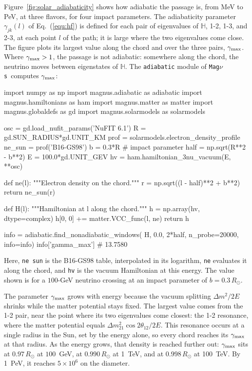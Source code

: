 \documentclass[final,5p,times,twocolumn,sort,compress]{elsarticle}
\makeatletter
\newcommand{\eq}{Eq.}
\DeclareRobustCommand{\_}{%
  \ifmmode\nfss@text{\textunderscore}\else\textunderscore\allowbreak\fi}
\newcommand{\equ}[1]{\eq~(\ref{equ:#1})}
\newcommand{\magnus}{{\tt Mag}\ensuremath{\nu}{\tt s}}
\makeatother
\begin{document}
Figure~\ref{fig:solar_adiabaticity} shows how adiabatic the passage is, from MeV to PeV, at three flavors, for four impact parameters. The adiabaticity parameter $\gamma_{jk}(l)$ of \equ{hf} is defined for each pair of eigenvalues of $\mathbb{H}$, 1-2, 1-3, and 2-3, at each point $l$ of the path; it is large where the two eigenvalues come close. The figure plots its largest value along the chord and over the three pairs, $\gamma_{\rm max}$. Where $\gamma_{\rm max} > 1$, the passage is not adiabatic: somewhere along the chord, the neutrino moves between eigenstates of $\mathbb{H}$. The {\tt adiabatic} module of \magnus\ computes $\gamma_{\rm max}$:
\begin{pysnip}
import numpy as np
import magnus.adiabatic as adiabatic
import magnus.hamiltonians as ham
import magnus.matter as matter
import magnus.globaldefs as gd
import magnus.solarmodels as solarmodels

osc = gd.load_nufit_params('NuFIT 6.1')
R = gd.SUN_RADIUS*gd.UNIT_KM
prof = solarmodels.electron_density_profile
ne_sun = prof('B16-GS98')
b = 0.3*R                # impact parameter
half = np.sqrt(R**2 - b**2)
E = 100.0*gd.UNIT_GEV
hv = ham.hamiltonian_3nu_vacuum(E, **osc)

def ne(l):
    """Electron density on the chord."""
    r = np.sqrt((l - half)**2 + b**2)
    return ne_sun(r)

def H(l):
    """Hamiltonian at l along the chord."""
    h = np.array(hv, dtype=complex)
    h[0, 0] += matter.VCC_func(l, ne)
    return h

info = {}
adiabatic.find_nonadiabatic_windows(
    H, 0.0, 2*half, n_probe=20000,
    info=info)
info['gamma_max']        # 13.7580
\end{pysnip}
Here, {\tt ne\_sun} is the B16-GS98 table, interpolated in its logarithm, {\tt ne} evaluates it along the chord, and {\tt hv} is the vacuum Hamiltonian at this energy. The value shown is for a $100$-GeV neutrino crossing at an impact parameter of $b = 0.3\,R_\odot$.

The parameter $\gamma_{\rm max}$ grows with energy because the vacuum splitting $\Delta m^2/2E$ shrinks while the matter potential stays fixed. The largest value comes from the 1-2 pair, near the point where its two eigenvalues come closest: the 1-2 resonance, where the matter potential equals $\Delta m^2_{21}\cos 2\theta_{12}/2E$. This resonance occurs at a single radius in the Sun, set by the energy alone, so every chord reaches its $\gamma_{\rm max}$ at that radius. As the energy grows, that density is reached further out: $\gamma_{\rm max}$ sits at $0.97\,R_\odot$ at $100$~GeV, at $0.990\,R_\odot$ at 1~TeV, and at $0.998\,R_\odot$ at 100~TeV. By 1~PeV, it reaches $5\times10^6$ on the diameter.
\end{document}
